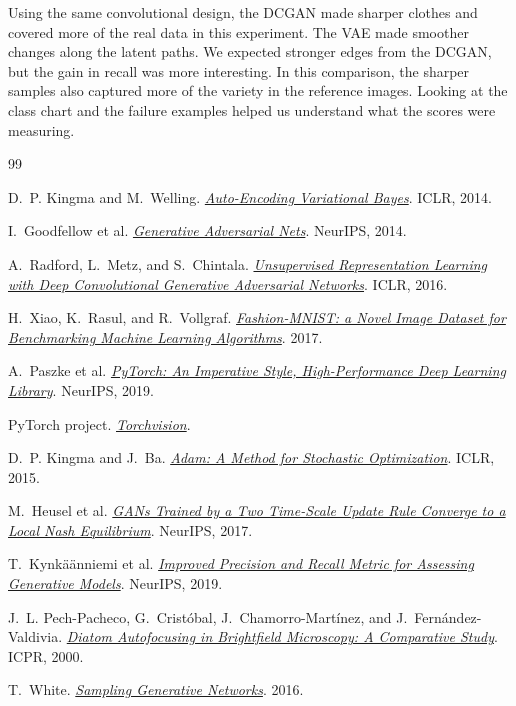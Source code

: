 \documentclass[11pt,letterpaper]{article}
\begin{document}
Using the same convolutional design, the DCGAN made sharper clothes and
covered more of the real data in this experiment. The VAE made smoother
changes along the latent paths. We expected stronger edges from the
DCGAN, but the gain in recall was more interesting. In this comparison,
the sharper samples also captured more of the variety in the reference
images. Looking at the class chart and the failure examples helped us
understand what the scores were measuring.

\clearpage
\begin{thebibliography}{99}

D.~P. Kingma and M.~Welling.
\href{https://arxiv.org/abs/1312.6114}{\emph{Auto-Encoding Variational Bayes}}.
ICLR, 2014.

I.~Goodfellow et al.
\href{https://arxiv.org/abs/1406.2661}{\emph{Generative Adversarial Nets}}.
NeurIPS, 2014.

A.~Radford, L.~Metz, and S.~Chintala.
\href{https://arxiv.org/abs/1511.06434}{\emph{Unsupervised Representation
Learning with Deep Convolutional Generative Adversarial Networks}}.
ICLR, 2016.

H.~Xiao, K.~Rasul, and R.~Vollgraf.
\href{https://arxiv.org/abs/1708.07747}{\emph{Fashion-MNIST: a Novel Image
Dataset for Benchmarking Machine Learning Algorithms}}.
2017.

A.~Paszke et al.
\href{https://arxiv.org/abs/1912.01703}{\emph{PyTorch: An Imperative Style,
High-Performance Deep Learning Library}}.
NeurIPS, 2019.

PyTorch project.
\href{https://github.com/pytorch/vision}{\emph{Torchvision}}.

D.~P. Kingma and J.~Ba.
\href{https://arxiv.org/abs/1412.6980}{\emph{Adam: A Method for Stochastic
Optimization}}.
ICLR, 2015.

M.~Heusel et al.
\href{https://arxiv.org/abs/1706.08500}{\emph{GANs Trained by a Two
Time-Scale Update Rule Converge to a Local Nash Equilibrium}}.
NeurIPS, 2017.

T.~Kynk\"a\"anniemi et al.
\href{https://arxiv.org/abs/1904.06991}{\emph{Improved Precision and Recall
Metric for Assessing Generative Models}}.
NeurIPS, 2019.

J.~L. Pech-Pacheco, G.~Crist\'obal, J.~Chamorro-Mart\'inez, and
J.~Fern\'andez-Valdivia.
\href{https://doi.org/10.1109/ICPR.2000.903548}{\emph{Diatom Autofocusing
in Brightfield Microscopy: A Comparative Study}}.
ICPR, 2000.

T.~White.
\href{https://arxiv.org/abs/1609.04468}{\emph{Sampling Generative Networks}}.
2016.

\end{thebibliography}
\end{document}
